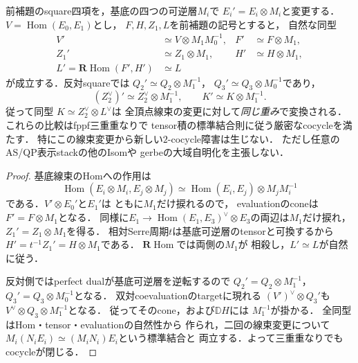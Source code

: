 \begin{corollary}
\label{cor:qa-dual-normal-vertex-line-descent}
前補題のsquare四項を，基底の四つの可逆層$M_i$で
$E_i'=E_i\otimes M_i$と変更する．
$V=\operatorname{Hom}(E_0,E_1)$とし，
$F,H,Z_1,L$を前補題の記号とすると，
自然な同型
\[
 \begin{aligned}
 V'&\simeq V\otimes M_1M_0^{-1},&
 F'&\simeq F\otimes M_1,\\
 Z_1'&\simeq Z_1\otimes M_1,&
 H'&\simeq H\otimes M_1,\\
 L'=\mathbf R\operatorname{Hom}(F',H')
   &\simeq L
 \end{aligned}
 \tag{VL}\label{eq:qa-dual-normal-vertex-line-weights}
\]
が成立する．反対squareでは
$Q_2'\simeq Q_2\otimes M_1^{-1}$，
$Q_3'\simeq Q_3\otimes M_0^{-1}$であり，
\[
 (Z_2^\vee)'\simeq Z_2^\vee\otimes M_1^{-1},
 \qquad K'\simeq K\otimes M_1^{-1}.
\]
従って同型
$K\simeq Z_2^\vee\otimes L^\vee$は
全頂点線束の変更に対して\emph{同じ重み}で変換される．
これらの比較はfppf三重重なりで
tensor積の標準結合則に従う厳密なcocycleを満たす．
特にこの線束変更から新しい$2$-cocycle障害は生じない．
ただし任意のAS/QP表示stackの他のIsomや
gerbeの大域自明化を主張しない．
\end{corollary}
\begin{proof}
基底線束のHomへの作用は
\[
 \operatorname{Hom}(E_i\otimes M_i,E_j\otimes M_j)
 \simeq\operatorname{Hom}(E_i,E_j)\otimes M_jM_i^{-1}
\]
である．$V'\otimes E_0'$と$E_1'$は
ともに$M_1$だけ捩れるので，
evaluationのconeは$F'=F\otimes M_1$となる．
同様に$E_1\to\operatorname{Hom}(E_1,E_3)^\vee
\otimes E_3$の両辺は$M_1$だけ捩れ，
$Z_1'=Z_1\otimes M_1$を得る．
相対Serre周期$t$は基底可逆層のtensorと可換するから
$H'=t^{-1}Z_1'=H\otimes M_1$である．
$\mathbf R\operatorname{Hom}$では両側の$M_1$が
相殺し，$L'\simeq L$が自然に従う．

反対側ではperfect dualが基底可逆層を逆転するので
$Q_2'=Q_2\otimes M_1^{-1}$，
$Q_3'=Q_3\otimes M_0^{-1}$となる．
双対coevaluationのtargetに現れる
$(V')^\vee\otimes Q_3'$も
$V^\vee\otimes Q_3\otimes M_1^{-1}$となる．
従ってそのcone，および$\mathbb D H$には
$M_1^{-1}$が掛かる．
全同型はHom・tensor・evaluationの自然性から
作られ，二回の線束変更について
$M_i(N_iE_i)\simeq(M_iN_i)E_i$という標準結合と
両立する．よって三重重なりでもcocycleが閉じる．
\end{proof}

